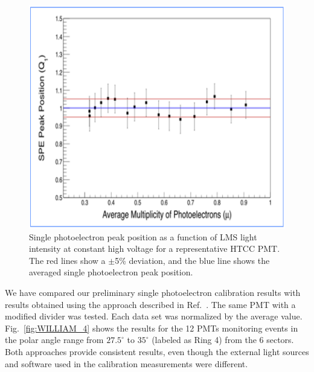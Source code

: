\begin{figure}[ht]
\centering
\includegraphics[width=0.99\linewidth]{images/WILLIAM_5.png}
\caption{Single photoelectron peak position as a function of LMS light intensity at constant high voltage for a
  representative HTCC PMT. The red lines show a $\pm$5\% deviation, and the blue line shows the averaged
  single photoelectron peak position.}
\label{fig:WILLIAM_5}
\end{figure}


We have compared our preliminary single photoelectron calibration results with results obtained using the
approach described in Ref.~\cite{degtiarenko2017}. The same PMT with a modified divider was tested. Each data
set was normalized by the average value. Fig.~\ref{fig:WILLIAM_4} shows the results for the 12 PMTs monitoring
events in the polar angle range from $27.5^\circ$ to $35^\circ$ (labeled as Ring 4) from the 6 sectors. Both approaches
provide consistent results, even though the external light sources and software used in the calibration measurements
were different.

